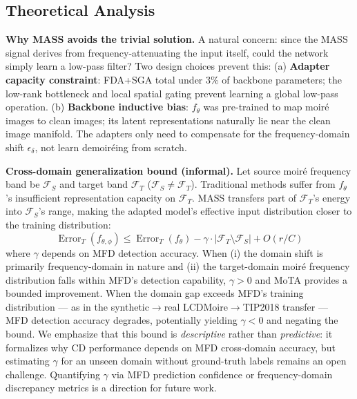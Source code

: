 \documentclass[10pt,twocolumn,letterpaper]{article}
\begin{document}
\subsection{Theoretical Analysis}

\textbf{Why MASS avoids the trivial solution.} A natural concern: since the MASS signal derives from frequency-attenuating the input itself, could the network simply learn a low-pass filter? Two design choices prevent this: (a) \textbf{Adapter capacity constraint}: FDA+SGA total under 3\% of backbone parameters; the low-rank bottleneck and local spatial gating prevent learning a global low-pass operation. (b) \textbf{Backbone inductive bias}: $f_\theta$ was pre-trained to map moir\'{e} images to clean images; its latent representations naturally lie near the clean image manifold. The adapters only need to compensate for the frequency-domain shift $\epsilon_\delta$, not learn demoir\'{e}ing from scratch.

\textbf{Cross-domain generalization bound (informal).} Let source moir\'{e} frequency band be $\mathcal{F}_S$ and target band $\mathcal{F}_T$ ($\mathcal{F}_S \neq \mathcal{F}_T$). Traditional methods suffer from $f_\theta$'s insufficient representation capacity on $\mathcal{F}_T$. MASS transfers part of $\mathcal{F}_T$'s energy into $\mathcal{F}_S$'s range, making the adapted model's effective input distribution closer to the training distribution:
\begin{equation}
\operatorname{Error}_T(f_{\theta,\phi}) \leq \operatorname{Error}_T(f_\theta) - \gamma \cdot |\mathcal{F}_T \setminus \mathcal{F}_S| + O(r/C)
\end{equation}
where $\gamma$ depends on MFD detection accuracy. When (i) the domain shift is primarily frequency-domain in nature and (ii) the target-domain moir\'{e} frequency distribution falls within MFD's detection capability, $\gamma > 0$ and MoTA provides a bounded improvement. When the domain gap exceeds MFD's training distribution --- as in the synthetic$\to$real LCDMoire$\to$TIP2018 transfer --- MFD detection accuracy degrades, potentially yielding $\gamma < 0$ and negating the bound. We emphasize that this bound is \textit{descriptive} rather than \textit{predictive}: it formalizes why CD performance depends on MFD cross-domain accuracy, but estimating $\gamma$ for an unseen domain without ground-truth labels remains an open challenge. Quantifying $\gamma$ via MFD prediction confidence or frequency-domain discrepancy metrics is a direction for future work.
\end{document}
